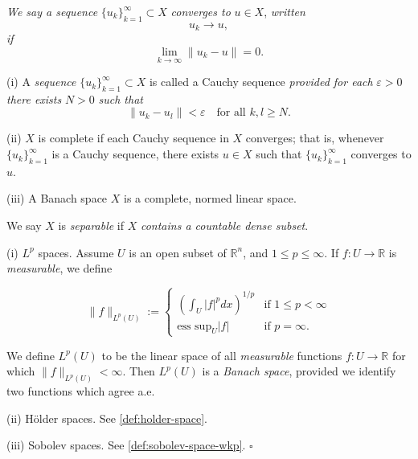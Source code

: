 \begin{definition}
\label{def:convergence-normed-space}
\textit{We say a sequence} $\{u_k\}_{k=1}^{\infty} \subset X$ \textit{converges to} $u \in X$, \textit{written}
$$u_k \to u,$$
\textit{if}
$$\lim_{k \to \infty} \|u_k - u\| = 0.$$
\end{definition}

\begin{definition}
\label{def:cauchy-sequence-complete-banach-space}
(i) A \textit{sequence} $\{u_k\}_{k=1}^{\infty} \subset X$ is called a Cauchy sequence \textit{provided for each} $\varepsilon > 0$ \textit{there exists} $N > 0$ \textit{such that}
$$\|u_k - u_l\| < \varepsilon \quad \text{for all } k, l \geq N.$$

(ii) $X$ is complete if each Cauchy sequence in $X$ converges; that is, whenever $\{u_k\}_{k=1}^{\infty}$ is a Cauchy sequence, there exists $u \in X$ such that $\{u_k\}_{k=1}^{\infty}$ converges to $u$.

(iii) A Banach space $X$ is a complete, normed linear space.
\end{definition}

\begin{definition}
\label{def:separable-space}
We say $X$ is \textit{separable} if $X$ \textit{contains a countable dense subset}.
\end{definition}

\begin{example}
\label{ex:banach-space-examples-lp-holder-sobolev}
(i) $L^p$ spaces. Assume $U$ is an open subset of $\mathbb{R}^n$, and $1 \le p \le \infty$. If $f : U \to \mathbb{R}$ is \textit{measurable}, we define

$$\|f\|_{L^p(U)} := \begin{cases} \left(\int_U |f|^p dx\right)^{1/p} & \text{if } 1 \le p < \infty \\ \text{ess sup}_U |f| & \text{if } p = \infty. \end{cases}$$

We define $L^p(U)$ to be the linear space of all \textit{measurable} functions $f : U \to \mathbb{R}$ for which $\|f\|_{L^p(U)} < \infty$. Then $L^p(U)$ is a \textit{Banach space}, provided we identify two functions which agree a.e.

(ii) H\"older spaces. See \cref{def:holder-space}.

(iii) Sobolev spaces. See \cref{def:sobolev-space-wkp}. $\square$
\end{example}

